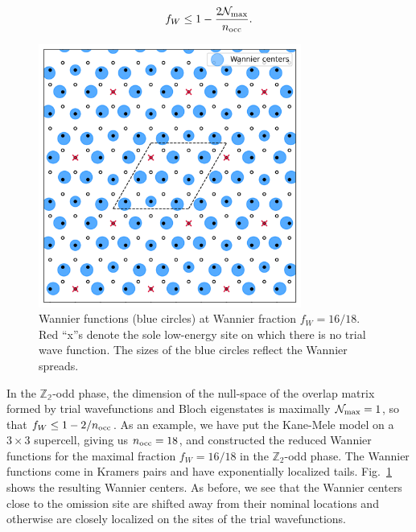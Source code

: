 \documentclass[galley,aps,pra,10pt,amsmath,amssymb,
    superscriptaddress,nofootinbib,longbibliography]{revtex4-2}
\begin{document}
\begin{equation}
   f_W \leq 1 - \frac{2\mathcal{N}_{\rm max}}{n_{\rm occ}}.
\end{equation}

\begin{figure}[b!]
\begin{center}
\includegraphics[width=3.4in]{fig14.png}
\end{center}
\vspace{-5mm}
\caption{Wannier functions (blue circles) at Wannier fraction $f_W = 16/18$. Red ``x''s denote the sole low-energy site on which there is no trial wave function. The sizes of the blue circles reflect the Wannier spreads.}
\label{FIG14}
\end{figure}

In the $\mathbb{Z_2}$-odd phase, the dimension of the null-space of the overlap matrix formed by trial wavefunctions and Bloch eigenstates is maximally $\mathcal{N}_{\rm max}=1$, so that $f_W \leq 1 - 2/n_{\rm occ}$. As an example, we have put the Kane-Mele model on a $3\times 3$ supercell, giving us $n_{\rm occ} = 18$, and constructed the reduced Wannier functions for the maximal fraction $f_W = 16/18$ in the $\mathbb{Z}_2$-odd phase. The Wannier functions come in Kramers pairs and have exponentially localized tails. Fig.~\ref{FIG14} shows the resulting Wannier centers. As before, we see that the Wannier centers close to the omission site are shifted away from their nominal locations and otherwise are closely localized on the sites of the trial wavefunctions.
\\
\\
\\
\\
\clearpage
\end{document}
